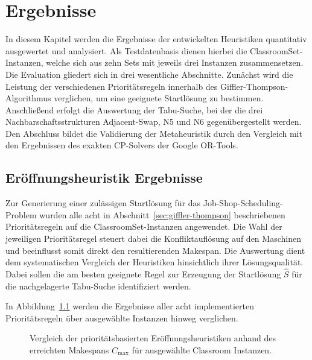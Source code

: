 \chapter{Ergebnisse}
\label{ch:ergebnisse}

In diesem Kapitel werden die Ergebnisse der entwickelten Heuristiken quantitativ ausgewertet und analysiert.
Als Testdatenbasis dienen hierbei die ClassroomSet-Instanzen, welche sich aus zehn Sets mit jeweils drei Instanzen zusammensetzen.
Die Evaluation gliedert sich in drei wesentliche Abschnitte.
Zunächst wird die Leistung der verschiedenen Prioritätsregeln innerhalb des Giffler-Thompson-Algorithmus verglichen, um eine geeignete Startlösung zu bestimmen.
Anschließend erfolgt die Auswertung der Tabu-Suche, bei der die drei Nachbarschaftsstrukturen Adjacent-Swap, N5 und N6 gegenübergestellt werden.
Den Abschluss bildet die Validierung der Metaheuristik durch den Vergleich mit den Ergebnissen des exakten CP-Solvers der Google OR-Tools.


\section{Eröffnungsheuristik Ergebnisse}
\label{sec:ergebnisse_eroeffnungsheuristik}

Zur Generierung einer zulässigen Startlösung für das Job-Shop-Scheduling-Problem wurden alle acht in Abschnitt~\ref{sec:giffler-thompson} beschriebenen Prioritätsregeln auf die ClassroomSet-Instanzen angewendet.
Die Wahl der jeweiligen Prioritätsregel steuert dabei die Konfliktauflösung auf den Maschinen und beeinflusst somit direkt den resultierenden Makespan.
Die Auswertung dient dem systematischen Vergleich der Heuristiken hinsichtlich ihrer Lösungsqualität.
Dabei sollen die am besten geeignete Regel zur Erzeugung der Startlösung $\hat{S}$ für die nachgelagerte Tabu-Suche identifiziert werden.


In Abbildung~\ref{fig:rule_comparison} werden die Ergebnisse aller acht implementierten Prioritätsregeln über ausgewählte Instanzen hinweg verglichen.

\begin{figure}[H]
    \centering
    
    \caption{Vergleich der prioritätsbasierten Eröffnungsheuristiken anhand des erreichten Makespans $C_{\max}$ für ausgewählte Classroom Instanzen.}
    \label{fig:rule_comparison}
\end{figure}

